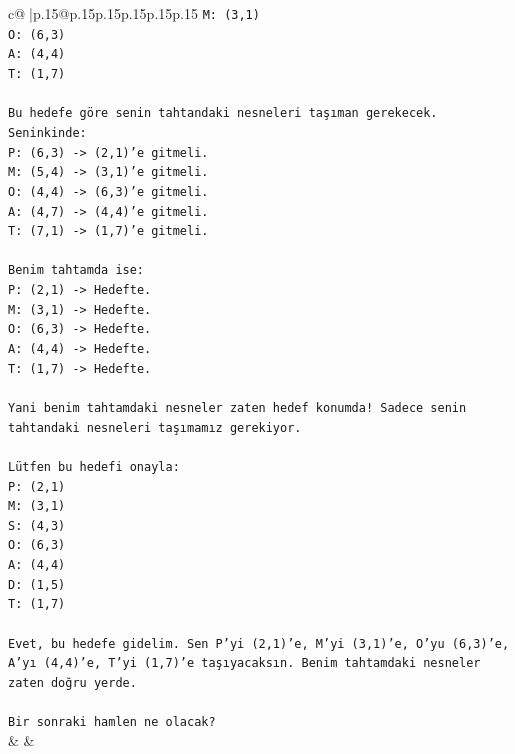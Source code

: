 \documentclass{article}
\begin{document}
{\begin{supertabular}{c@{$\;$}|p{.15\linewidth}@{}p{.15\linewidth}p{.15\linewidth}p{.15\linewidth}p{.15\linewidth}p{.15\linewidth}}
{{{\texttt{M: (3,1)} \\
\texttt{O: (6,3)} \\
\texttt{A: (4,4)} \\
\texttt{T: (1,7)} \\
\\ 
\texttt{Bu hedefe göre senin tahtandaki nesneleri taşıman gerekecek.} \\
\texttt{Seninkinde:} \\
\texttt{P: (6,3) {-}> (2,1)'e gitmeli.} \\
\texttt{M: (5,4) {-}> (3,1)'e gitmeli.} \\
\texttt{O: (4,4) {-}> (6,3)'e gitmeli.} \\
\texttt{A: (4,7) {-}> (4,4)'e gitmeli.} \\
\texttt{T: (7,1) {-}> (1,7)'e gitmeli.} \\
\\ 
\texttt{Benim tahtamda ise:} \\
\texttt{P: (2,1) {-}> Hedefte.} \\
\texttt{M: (3,1) {-}> Hedefte.} \\
\texttt{O: (6,3) {-}> Hedefte.} \\
\texttt{A: (4,4) {-}> Hedefte.} \\
\texttt{T: (1,7) {-}> Hedefte.} \\
\\ 
\texttt{Yani benim tahtamdaki nesneler zaten hedef konumda! Sadece senin tahtandaki nesneleri taşımamız gerekiyor.} \\
\\ 
\texttt{Lütfen bu hedefi onayla:} \\
\texttt{P: (2,1)} \\
\texttt{M: (3,1)} \\
\texttt{S: (4,3)} \\
\texttt{O: (6,3)} \\
\texttt{A: (4,4)} \\
\texttt{D: (1,5)} \\
\texttt{T: (1,7)} \\
\\ 
\texttt{Evet, bu hedefe gidelim. Sen P'yi (2,1)'e, M'yi (3,1)'e, O'yu (6,3)'e, A'yı (4,4)'e, T'yi (1,7)'e taşıyacaksın. Benim tahtamdaki nesneler zaten doğru yerde.} \\
\\ 
\texttt{Bir sonraki hamlen ne olacak?} \\
            }
        }
    }
    & & \\ \\


\end{supertabular}}
\end{document}
